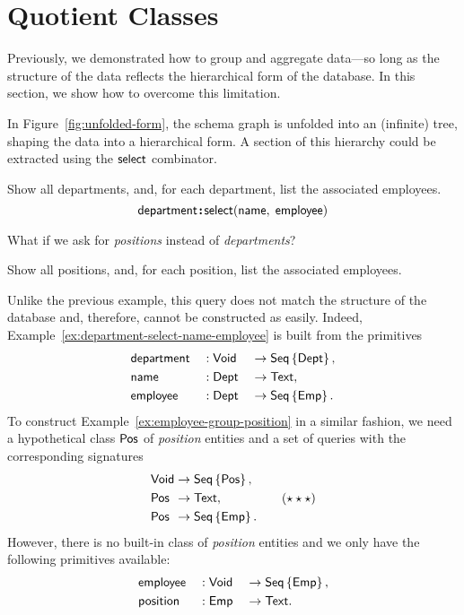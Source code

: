 
\section{Quotient Classes}
\label{sec:quotients}

Previously, we demonstrated how to group and aggregate data---so long as the
structure of the data reflects the hierarchical form of the database.  In this
section, we show how to overcome this limitation.

In Figure~\ref{fig:unfolded-form}, the schema graph is unfolded into an
(infinite) tree, shaping the data into a hierarchical form.  A section of this
hierarchy could be extracted using the $\textup{\textsf{select}}$ combinator.

\begin{example}
    \label{ex:department-select-name-employee}
    Show all departments, and, for each department, list the associated
    employees.
    \begin{equation*}
        \textup{\textsf{department}}\!\boldsymbol{:}\!\textup{\textsf{select}}(\textup{\textsf{name}},\; \textup{\textsf{employee}})
    \end{equation*}
\end{example}

What if we ask for \emph{positions} instead of \emph{departments}?

\begin{example}
    \label{ex:employee-group-position}
    Show all positions, and, for each position, list the associated employees.
\end{example}

Unlike the previous example, this query does not match the structure of the
database and, therefore, cannot be constructed as easily.  Indeed,
Example~\ref{ex:department-select-name-employee} is built from the primitives
\begin{alignat*}{3}
    & \textup{\textsf{department}} && : \textup{\textsf{Void}} && \to \textup{\textsf{Seq}}\left\{\textup{\textsf{Dept}}\right\}, \\
    & \textup{\textsf{name}} && : \textup{\textsf{Dept}} && \to \textup{\textsf{Text}}, \\
    & \textup{\textsf{employee}} && : \textup{\textsf{Dept}} && \to \textup{\textsf{Seq}}\left\{\textup{\textsf{Emp}}\right\}.
\end{alignat*}
To construct Example~\ref{ex:employee-group-position} in a similar fashion, we
need a hypothetical class $\textup{\textsf{Pos}}$ of \emph{position} entities and a set of
queries with the corresponding signatures
\begin{equation}
    \label{eq:group-components}
    \begin{alignedat}{2}
        & \textup{\textsf{Void}} && \to \textup{\textsf{Seq}}\left\{\textup{\textsf{Pos}}\right\}, \\
        & \textup{\textsf{Pos}} && \to \textup{\textsf{Text}}, \\
        & \textup{\textsf{Pos}} && \to \textup{\textsf{Seq}}\left\{\textup{\textsf{Emp}}\right\}.
    \end{alignedat} \tag{$\star\star\star$}
\end{equation}
However, there is no built-in class of \emph{position} entities and we only
have the following primitives available:
\begin{alignat*}{3}
    & \textup{\textsf{employee}} && : \textup{\textsf{Void}} && \to \textup{\textsf{Seq}}\left\{\textup{\textsf{Emp}}\right\}, \\
    & \textup{\textsf{position}} && : \textup{\textsf{Emp}} && \to \textup{\textsf{Text}}.
\end{alignat*}

